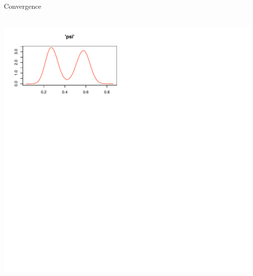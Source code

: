 \documentclass{beamer}
\begin{document}
\begin{frame}{Convergence}
	\begin{center}
		 \\
		\includegraphics[scale=0.8]{distnNoConvergence.pdf} \\
	\end{center}
\end{frame}
\end{document}
